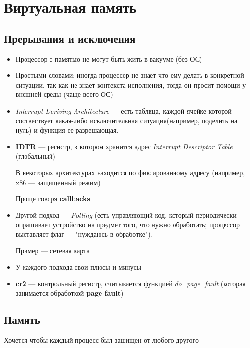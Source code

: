 \documentclass[../../lectures.tex]{subfiles}
\begin{document}
\chapter{Виртуальная память}

\section{Прерывания и исключения}
\begin{itemize}
    \item Процессор с памятью не могут быть жить в вакууме (без ОС)
    \item Простыми словами: иногда процессор не знает что ему делать 
          в конкретной ситуации, так как не знает контекста исполнения, 
          тогда он просит помощи у внешней среды (чаще всего ОС)
    \item \emph{Interrupt Deriving Architecture} --- есть таблица, каждой ячейке 
          которой соотвествует какая-либо исключительная ситуация(например, 
          поделить на нуль) и функция ее разрешающая.
    \item \textbf{IDTR} --- регистр, в котором хранится адрес 
          \emph{Interrupt Descriptor Table} (глобальный)

          В некоторых архитектурах находится по фиксированному адресу 
          (например, x86 --- защищенный режим)

          Проще говоря \textbf{callbacks}

    \item Другой подход --- \emph{Polling} (есть управляющий код, 
          который периодически опрашивает устройство на предмет того,
          что нужно обработать; процессор выставляет флаг --- 
          "нуждаюсь в обработке"). 
          
          Пример --- сетевая карта

    \item У каждого подхода свои плюсы и минусы

    \item \textbf{cr2} --- контрольный регистр, считывается функцией \emph{do\_page\_fault} 
          (которая занимается обработкой \textbf{page fault})
\end{itemize}

\newpage
\section{Память}
Хочется чтобы каждый процесс был защищен от любого другого
\end{document}
